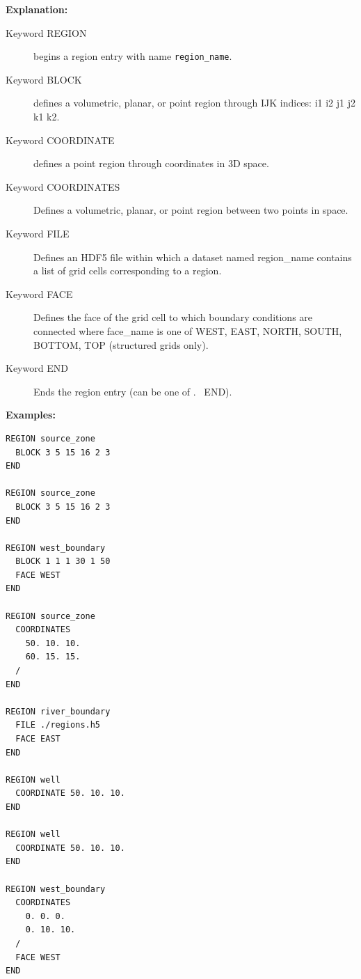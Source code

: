 \documentclass[12pt]{article}
\begin{document}
{\noindent\bf Explanation:}
\begin{description}
\item[Keyword REGION] begins a region entry with name {\tt region\_name}.
\item[Keyword BLOCK] defines a volumetric, planar, or point region through IJK indices: i1 i2 j1 j2 k1 k2.
\item[Keyword COORDINATE] defines a point region through coordinates in 3D space.
\item[Keyword COORDINATES] Defines a volumetric, planar, or point region between two points in space.
\item[Keyword FILE] Defines an HDF5 file within which a dataset named
region\_name contains a list of grid cells corresponding to a region.
\item [Keyword FACE] Defines the face of the grid cell to which boundary conditions are connected where face\_name is one of WEST, EAST, NORTH, SOUTH, BOTTOM, TOP (structured grids only).
\item [Keyword END] Ends the region entry (can be one of . \ END).
\end{description}

\begin{mdframed}

{\noindent\bf
Examples:}

\begin{verbatim}
REGION source_zone
  BLOCK 3 5 15 16 2 3
END

REGION source_zone
  BLOCK 3 5 15 16 2 3
END

REGION west_boundary
  BLOCK 1 1 1 30 1 50
  FACE WEST
END

REGION source_zone
  COORDINATES
    50. 10. 10.
    60. 15. 15.
  /
END

REGION river_boundary
  FILE ./regions.h5
  FACE EAST
END

REGION well
  COORDINATE 50. 10. 10.
END

REGION well
  COORDINATE 50. 10. 10.
END

REGION west_boundary
  COORDINATES
    0. 0. 0.
    0. 10. 10.
  /
  FACE WEST
END
\end{verbatim}

\end{mdframed}

\hyperlink{target_key}{\return}


\newpage
\protect\hypertarget{target_restart}{}
\end{document}
